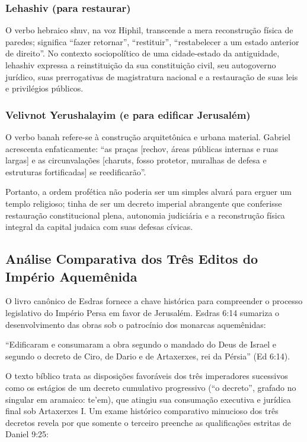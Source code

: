 \subsubsection*{Lehashiv (para restaurar)}
O verbo hebraico shuv, na voz Hiphil, transcende a mera reconstrução física de paredes; significa ``fazer retornar'', ``restituir'', ``restabelecer a um estado anterior de direito''. No contexto sociopolítico de uma cidade-estado da antiguidade, lehashiv expressa a reinstituição da sua constituição civil, seu autogoverno jurídico, suas prerrogativas de magistratura nacional e a restauração de suas leis e privilégios públicos.

\subsubsection*{Velivnot Yerushalayim (e para edificar Jerusalém)}
O verbo banah refere-se à construção arquitetônica e urbana material. Gabriel acrescenta enfaticamente: ``as praças [rechov, áreas públicas internas e ruas largas] e as circunvalações [charuts, fosso protetor, muralhas de defesa e estruturas fortificadas] se reedificarão''.

Portanto, a ordem profética não poderia ser um simples alvará para erguer um templo religioso; tinha de ser um decreto imperial abrangente que conferisse restauração constitucional plena, autonomia judiciária e a reconstrução física integral da capital judaica com suas defesas cívicas.



\subsection{Análise Comparativa dos Três Editos do Império Aquemênida}


O livro canônico de Esdras fornece a chave histórica para compreender o processo legislativo do Império Persa em favor de Jerusalém. Esdras 6:14 sumariza o desenvolvimento das obras sob o patrocínio dos monarcas aquemênidas:

``Edificaram e consumaram a obra segundo o mandado do Deus de Israel e segundo o decreto de Ciro, de Dario e de Artaxerxes, rei da Pérsia'' (Ed 6:14).

O texto bíblico trata as disposições favoráveis dos três imperadores sucessivos como os estágios de um decreto cumulativo progressivo (``o decreto'', grafado no singular em aramaico: te'em), que atingiu sua consumação executiva e jurídica final sob Artaxerxes I. Um exame histórico comparativo minucioso dos três decretos revela por que somente o terceiro preenche as qualificações estritas de Daniel 9:25:


